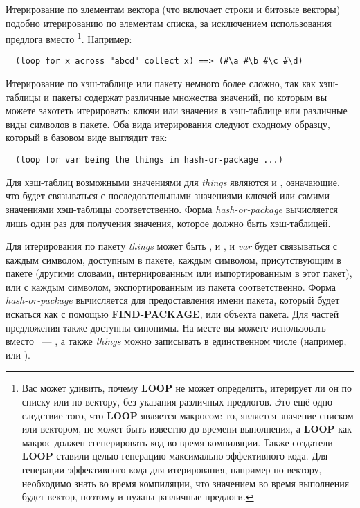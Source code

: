 Итерирование по элементам вектора (что включает строки и битовые векторы) подобно
итерированию по элементам списка, за исключением использования предлога 
вместо \footnote{Вас может удивить, почему \textbf{LOOP} не может определить,
  итерирует ли он по списку или по вектору, без указания различных предлогов. Это ещё одно
  следствие того, что \textbf{LOOP} является макросом: то, является значение списком или
  вектором, не может быть известно до времени выполнения, а \textbf{LOOP} как макрос
  должен сгенерировать код во время компиляции. Также создатели \textbf{LOOP} ставили
  целью генерацию максимально эффективного кода. Для генерации эффективного кода для
  итерирования, например по вектору, необходимо знать во время компиляции, что значением
  во время выполнения будет вектор, поэтому и нужны различные предлоги.}. Например:

\begin{lstlisting}
  (loop for x across "abcd" collect x) ==> (#\a #\b #\c #\d)
\end{lstlisting}

Итерирование по хэш-таблице или пакету немного более сложно, так как хэш-таблицы и пакеты
содержат различные множества значений, по которым вы можете захотеть итерировать: ключи
или значения в хэш-таблице или различные виды символов в пакете. Оба вида итерирования
следуют сходному образцу, который в базовом виде выглядит так:

\begin{lstlisting}
  (loop for var being the things in hash-or-package ...)
\end{lstlisting}

Для хэш-таблиц возможными значениями для \textit{things} являются  и
, означающие, что  будет связываться с последовательными
значениями ключей или самими значениями хэш-таблицы соответственно. Форма
\textit{hash-or-package} вычисляется лишь один раз для получения значения, которое должно
быть хэш-таблицей.

Для итерирования по пакету \textit{things} может быть ,
 и , и \textit{var} будет связываться с
каждым символом, доступным в пакете, каждым символом, присутствующим в пакете (другими
словами, интернированным или импортированным в этот пакет), или с каждым символом,
экспортированным из пакета соответственно. Форма \textit{hash-or-package} вычисляется для
предоставления имени пакета, который будет искаться как с помощью \textbf{FIND-PACKAGE},
или объекта пакета. Для частей предложения  также доступны синонимы. На месте
 вы можете использовать  вместо ~--- , а также
\textit{things} можно записывать в единственном числе (например,  или
).

